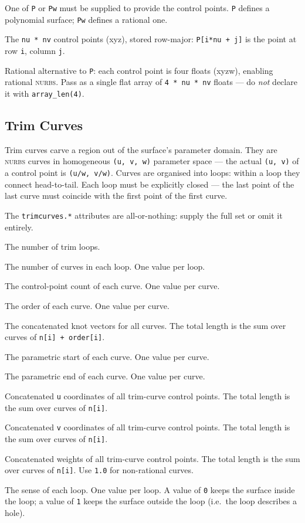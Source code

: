 \documentclass[oneside,ebook]{memoir}
\newcommand*{\acronym}[1]{\textsc{\lowercase{#1}}}
\newcommand{\paramlistitemTN}[2]{\item[#2\textcolor{lightgray}{\dotfill}#1]}
\begin{document}
One of \lstinline|P| or \lstinline|Pw| must be supplied to provide the control points. \lstinline|P| defines a polynomial surface; \lstinline|Pw| defines a rational one.

\begin{paramlist}
\paramlistitemTN{point}{P}
The \lstinline|nu * nv| control points (xyz), stored row-major: \lstinline|P[i*nu + j]| is the point at row \lstinline|i|, column \lstinline|j|.
\paramlistitemTN{float\lbrack{}4\rbrack{}}{Pw}
Rational alternative to \lstinline|P|: each control point is four floats (xyzw), enabling rational \acronym{NURBS}. Pass as a single flat array of \lstinline|4 * nu * nv| floats --- do \emph{not} declare it with \lstinline|array_len(4)|.
\end{paramlist}

\subsection*{Trim Curves}

Trim curves carve a region out of the surface's parameter domain. They are \acronym{NURBS} curves in homogeneous \lstinline|(u, v, w)| parameter space --- the actual \lstinline|(u, v)| of a control point is \lstinline|(u/w, v/w)|. Curves are organised into loops: within a loop they connect head-to-tail. Each loop must be explicitly closed --- the last point of the last curve must coincide with the first point of the first curve.

The \lstinline|trimcurves.*| attributes are all-or-nothing: supply the full set or omit it entirely.

\begin{paramlist}
\paramlistitemTN{int}{trimcurves.nloops}
The number of trim loops.
\paramlistitemTN{int}{trimcurves.ncurves}
The number of curves in each loop. One value per loop.
\paramlistitemTN{int}{trimcurves.n}
The control-point count of each curve. One value per curve.
\paramlistitemTN{int}{trimcurves.order}
The order of each curve. One value per curve.
\paramlistitemTN{float}{trimcurves.knot}
The concatenated knot vectors for all curves.
The total length is the sum over curves of \lstinline|n[i] + order[i]|.
\paramlistitemTN{float}{trimcurves.min}
The parametric start of each curve. One value per curve.
\paramlistitemTN{float}{trimcurves.max}
The parametric end of each curve. One value per curve.
\paramlistitemTN{float}{trimcurves.u}
Concatenated \lstinline|u| coordinates of all trim-curve control points.
The total length is the sum over curves of \lstinline|n[i]|.
\paramlistitemTN{float}{trimcurves.v}
Concatenated \lstinline|v| coordinates of all trim-curve control points.
The total length is the sum over curves of \lstinline|n[i]|.
\paramlistitemTN{float}{trimcurves.w}
Concatenated weights of all trim-curve control points.
The total length is the sum over curves of \lstinline|n[i]|.
Use \lstinline|1.0| for non-rational curves.
\paramlistitemTN{int}{trimcurves.sense}
The sense of each loop. One value per loop. A value of \lstinline|0| keeps the surface inside the loop; a value of \lstinline|1| keeps the surface outside the loop (i.e.\ the loop describes a hole).
\end{paramlist}
\end{document}
